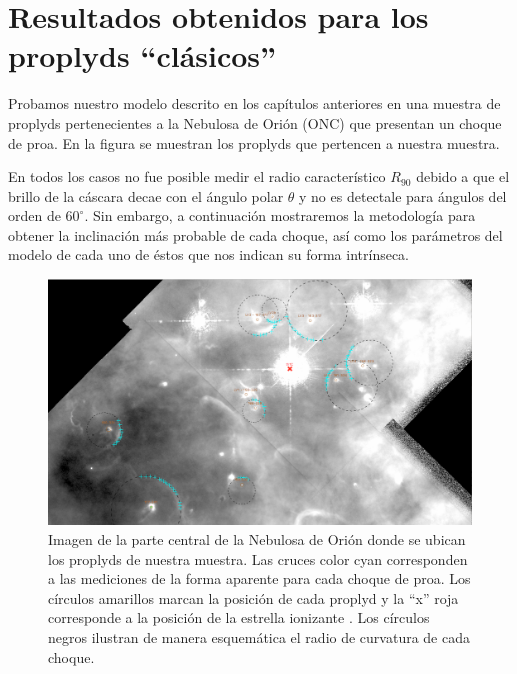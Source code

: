 \chapter{Resultados obtenidos para los proplyds ``clásicos''}
\label{chap:proplyds}
Probamos nuestro modelo descrito en los capítulos anteriores en una muestra de
proplyds pertenecientes a la Nebulosa de Orión (ONC) que presentan un choque de
proa. En la figura  se muestran los proplyds que pertencen a nuestra muestra.

En todos los casos no fue posible medir el radio característico $R_{90}$ debido a
que el brillo de la cáscara decae con el ángulo polar $\theta$ y no es detectale
para ángulos del orden de $60^\circ$. Sin embargo, a continuación mostraremos la
metodología para obtener la inclinación más probable de cada choque, así como los
parámetros del modelo de cada uno de éstos que nos indican su forma intrínseca.

\begin{figure}
    \includegraphics[width=\linewidth]{./Figures/LV-full-field-annotated}
    \caption{Imagen de la parte central de la Nebulosa de Orión donde se ubican
    los proplyds de nuestra muestra. Las cruces color cyan corresponden a las
    mediciones de la forma aparente para cada choque de proa. Los círculos
    amarillos marcan la posición de cada proplyd y la ``x'' roja corresponde a la posición de la estrella ionizante \thC{}. Los círculos negros ilustran de manera esquemática el radio de curvatura de cada choque.}
    \label{fig:proplyds-map}
\end{figure}

